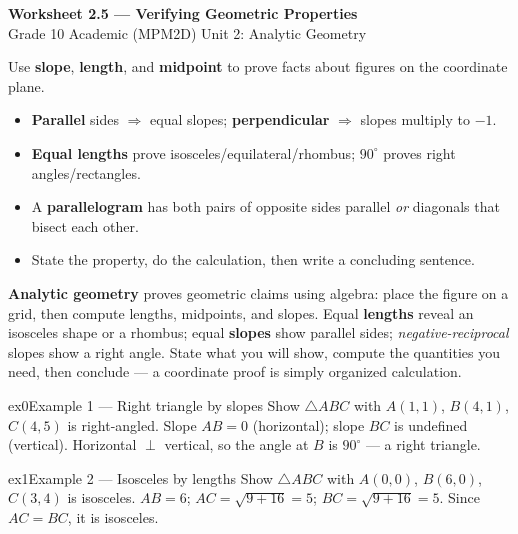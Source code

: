 \documentclass[11pt]{article}
\begin{document}
\begin{center}
{\LARGE\bfseries\color{titleblue}Worksheet 2.5 --- Verifying Geometric Properties}\\[2pt]
{\small Grade 10 Academic (MPM2D) \textperiodcentered{} Unit 2: Analytic Geometry}
\end{center}

\begin{ideabox}
Use \textbf{slope}, \textbf{length}, and \textbf{midpoint} to prove facts about figures on the coordinate plane.
\begin{itemize}[leftmargin=*,itemsep=2pt]
  \item \textbf{Parallel} sides $\Rightarrow$ equal slopes; \textbf{perpendicular} $\Rightarrow$ slopes multiply to $-1$.
  \item \textbf{Equal lengths} prove isosceles/equilateral/rhombus; \textbf{$90^\circ$} proves right angles/rectangles.
  \item A \textbf{parallelogram} has both pairs of opposite sides parallel \emph{or} diagonals that bisect each other.
  \item State the property, do the calculation, then write a concluding sentence.
\end{itemize}
\end{ideabox}

\begin{learnbox}
\textbf{Analytic geometry} proves geometric claims using algebra: place the figure on a grid, then compute lengths, midpoints, and slopes.
Equal \textbf{lengths} reveal an isosceles shape or a rhombus; equal \textbf{slopes} show parallel sides; \emph{negative-reciprocal} slopes show a right angle.
State what you will show, compute the quantities you need, then conclude — a coordinate proof is simply organized calculation.
\end{learnbox}


\begin{example}{ex0}{Example 1 --- Right triangle by slopes}
Show $\triangle ABC$ with $A(1,1)$, $B(4,1)$, $C(4,5)$ is right-angled.
\soln Slope $AB=0$ (horizontal); slope $BC$ is undefined (vertical). Horizontal $\perp$ vertical, so the angle at $B$ is $90^\circ$ --- a right triangle.
\end{example}

\begin{example}{ex1}{Example 2 --- Isosceles by lengths}
Show $\triangle ABC$ with $A(0,0)$, $B(6,0)$, $C(3,4)$ is isosceles.
\soln $AB=6$; $AC=\sqrt{9+16}=5$; $BC=\sqrt{9+16}=5$. Since $AC=BC$, it is isosceles.
\end{example}
\end{document}
